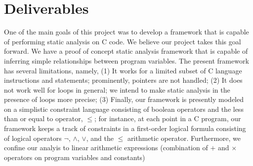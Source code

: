 \section{Deliverables} \label{del}
One of the main goals of this project was to develop a framework that is capable of performing static analysis on C code. We believe our project takes this goal forward. We have a proof of concept static analysis framework that is capable of inferring simple relationships between program variables. The present framework has several limitations, namely, (1) It works for a limited subset of C language instructions and statements; prominently, pointers are not handled; (2) It does not work well for loops in general; we intend to make static analysis in the presence of loops more precise; (3) Finally, our framework is presently modeled on a simplistic constraint language consisting of boolean operators and the less than or equal to operator, $\le$; for instance, at each point in a C program, our framework keeps a track of constraints in a first-order logical formula consisting of logical operators $\neg$, $\land$, $\lor$, and the $\le$ arithmetic operator. Furthermore, we confine our analyis to linear arithmetic expressions (combination of $+$ and $\times$ operators on program variables and constants)